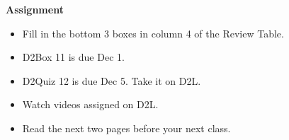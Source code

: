 \begin{center}
  {\large\bf Assignment}
\end{center}

\begin{itemize}
\item Fill in the bottom 3 boxes in column 4 of the Review Table. 
\item D2Box 11 is due Dec 1. 
\item D2Quiz 12 is due Dec 5.  Take it on D2L.
\item Watch videos assigned on D2L.
\item Read the next two pages before your next class.
\end{itemize}
